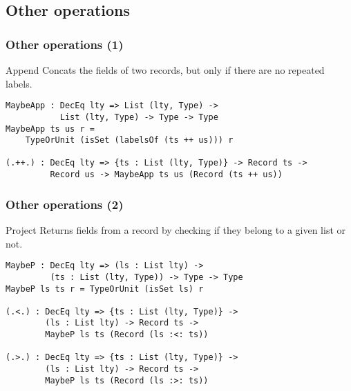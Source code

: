 \documentclass{beamer}
\begin{document}
\subsection{Other operations}

\begin{frame}[fragile]
\frametitle{Other operations (1)}

\begin{block}{Append}
Concats the fields of two records, but only if there are no repeated labels.

\begin{definition}
\begin{verbatim}
MaybeApp : DecEq lty => List (lty, Type) ->
           List (lty, Type) -> Type -> Type
MaybeApp ts us r = 
    TypeOrUnit (isSet (labelsOf (ts ++ us))) r

(.++.) : DecEq lty => {ts : List (lty, Type)} -> Record ts -> 
         Record us -> MaybeApp ts us (Record (ts ++ us))
\end{verbatim}
\end{definition}

\end{block}

\end{frame}

\begin{frame}[fragile]
\frametitle{Other operations (2)}

\begin{block}{Project}
Returns fields from a record by checking if they belong to a given list or not.

\begin{definition}
\begin{verbatim}
MaybeP : DecEq lty => (ls : List lty) -> 
         (ts : List (lty, Type)) -> Type -> Type
MaybeP ls ts r = TypeOrUnit (isSet ls) r

(.<.) : DecEq lty => {ts : List (lty, Type)} -> 
        (ls : List lty) -> Record ts -> 
        MaybeP ls ts (Record (ls :<: ts)) 

(.>.) : DecEq lty => {ts : List (lty, Type)} -> 
        (ls : List lty) -> Record ts -> 
        MaybeP ls ts (Record (ls :>: ts))
\end{verbatim}
\end{definition}

\end{block}

\end{frame}
\end{document}
